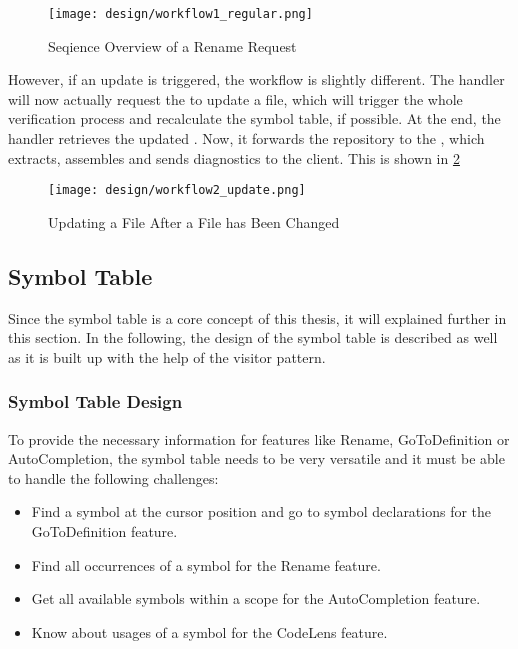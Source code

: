 \begin{figure}[H]
    \centering
    \texttt{[image: design/workflow1\_regular.png]}
    \caption{Seqience Overview of a Rename Request}
    \label{fig:workflow1}
\end{figure}

However, if an update is triggered, the workflow is slightly different.
The handler will now actually request the  to update a file, which will trigger the whole verification process and recalculate the symbol table, if possible.
At the end, the handler retrieves the updated .
Now, it forwards the repository to the , which extracts, assembles and sends diagnostics to the client.
This is shown in \ref{fig:workflow2}

\begin{figure}[H]
    \centering
    \texttt{[image: design/workflow2\_update.png]}
    \caption{Updating a File After a File has Been Changed}
    \label{fig:workflow2}
\end{figure}


\subsection{Symbol Table}
Since the symbol table is a core concept of this thesis, it will explained further in this section.
In the following, the design of the symbol table is described as well as it is built up with the help of the visitor pattern.

\subsubsection{Symbol Table Design}
To provide the necessary information for features like Rename, GoToDefinition or AutoCompletion,
the symbol table needs to be very versatile and it must be able to handle the following challenges:
\begin{itemize}
    \item Find a symbol at the cursor position and go to symbol declarations for the GoToDefinition feature.
    \item Find all occurrences of a symbol for the Rename feature.
    \item Get all available symbols within a scope for the AutoCompletion feature.
    \item Know about usages of a symbol for the CodeLens feature.
\end{itemize}

